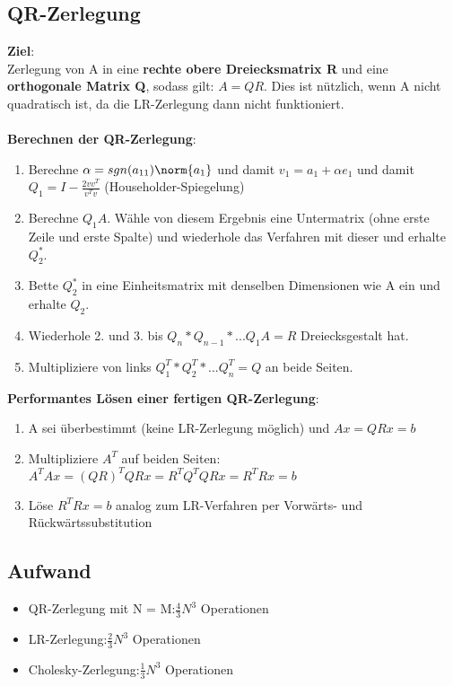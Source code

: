 \subsection{QR-Zerlegung}%
\label{zerl:sub:qr}
\textbf{Ziel}:\\Zerlegung von A in eine \textbf{rechte obere Dreiecksmatrix R} und eine \textbf{orthogonale Matrix Q}, sodass gilt: $A = QR$. Dies ist nützlich, wenn A nicht quadratisch ist, da die LR-Zerlegung dann nicht funktioniert.\\\\
\textbf{Berechnen der QR-Zerlegung}:
\begin{enumerate}
	\item Berechne $\alpha = sgn(a_{11})\norm{a_1}$ und damit $v_1 = a_1 + \alpha e_1$ und damit $Q_1 = I - \frac{2vv^T}{v^Tv}$ (Householder-Spiegelung)
	\item Berechne $Q_1A$. Wähle von diesem Ergebnis eine Untermatrix (ohne erste Zeile und erste Spalte) und wiederhole das Verfahren mit dieser und erhalte $Q_2^*$.
	\item Bette $Q_2^*$ in eine Einheitsmatrix mit denselben Dimensionen wie A ein und erhalte $Q_2$.
	\item Wiederhole 2. und 3. bis $Q_n * Q_{n - 1} * ... Q_1A = R$ Dreiecksgestalt hat.
	\item Multipliziere von links $Q_1^T * Q_2^T * ... Q_n^T = Q$ an beide Seiten.
\end{enumerate}
\newpage
\noindent\textbf{Performantes Lösen einer fertigen QR-Zerlegung}:
\begin{enumerate}
	\item A sei überbestimmt (keine LR-Zerlegung möglich) und $Ax = QRx = b$
	\item Multipliziere $A^T$ auf beiden Seiten: $A^TAx = (QR)^TQRx = R^TQ^TQRx = R^TRx = b$
	\item Löse $R^TRx = b$ analog zum LR-Verfahren per Vorwärts- und Rückwärtssubstitution
\end{enumerate}
\subsection{Aufwand}
\begin{itemize}
	\item QR-Zerlegung mit N = M:\hfill$\frac{4}{3}N^3$ Operationen
	\item LR-Zerlegung:\hfill$\frac{2}{3}N^3$ Operationen
	\item Cholesky-Zerlegung:\hfill$\frac{1}{3}N^3$ Operationen
\end{itemize}
